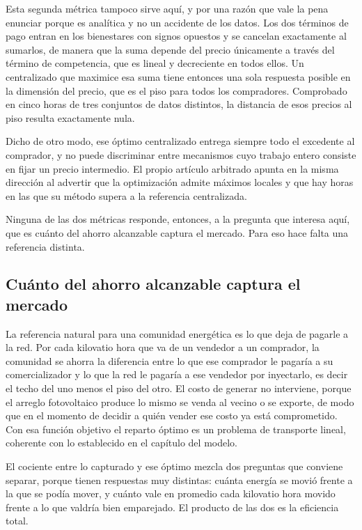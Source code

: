 Esta segunda métrica tampoco sirve aquí, y por una razón que vale la pena
enunciar porque es analítica y no un accidente de los datos. Los dos
términos de pago entran en los bienestares con signos opuestos y se cancelan
exactamente al sumarlos, de manera que la suma depende del precio únicamente
a través del término de competencia, que es lineal y decreciente en todos
ellos. Un centralizado que maximice esa suma tiene entonces una sola
respuesta posible en la dimensión del precio, que es el piso para todos los
compradores. Comprobado en cinco horas de tres conjuntos de datos distintos,
la distancia de esos precios al piso resulta exactamente nula.

Dicho de otro modo, ese óptimo centralizado entrega siempre todo el
excedente al comprador, y no puede discriminar entre mecanismos cuyo trabajo
entero consiste en fijar un precio intermedio. El propio artículo arbitrado
apunta en la misma dirección al advertir que la optimización admite máximos
locales y que hay horas en las que su método supera a la referencia
centralizada.

Ninguna de las dos métricas responde, entonces, a la pregunta que interesa
aquí, que es cuánto del ahorro alcanzable captura el mercado. Para eso hace
falta una referencia distinta.

\subsection{Cuánto del ahorro alcanzable captura el mercado}
\label{sub:verif-eficiencia}

La referencia natural para una comunidad energética es lo que deja de
pagarle a la red. Por cada kilovatio hora que va de un vendedor a un
comprador, la comunidad se ahorra la diferencia entre lo que ese comprador
le pagaría a su comercializador y lo que la red le pagaría a ese vendedor
por inyectarlo, es decir el techo del uno menos el piso del otro. El costo
de generar no interviene, porque el arreglo fotovoltaico produce lo mismo se
venda al vecino o se exporte, de modo que en el momento de decidir a quién
vender ese costo ya está comprometido. Con esa función objetivo el reparto
óptimo es un problema de transporte lineal, coherente con lo establecido en
el capítulo del modelo.

El cociente entre lo capturado y ese óptimo mezcla dos preguntas que
conviene separar, porque tienen respuestas muy distintas: cuánta energía se
movió frente a la que se podía mover, y cuánto vale en promedio cada
kilovatio hora movido frente a lo que valdría bien emparejado. El producto
de las dos es la eficiencia total.

